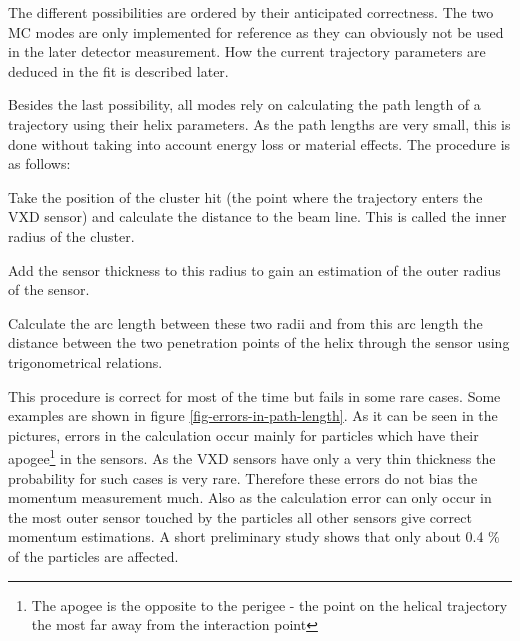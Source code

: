 The different possibilities are ordered by their anticipated correctness. The two MC modes are only implemented for reference as they can obviously not be used in the later detector measurement. How the current trajectory parameters are deduced in the fit is described later.

Besides the last possibility, all modes rely on calculating the path length of a trajectory using their helix parameters. As the path lengths are very small, this is done without taking into account energy loss or material effects. The procedure is as follows:
\begin{zlist}
 \item Take the position of the cluster hit (the point where the trajectory enters the VXD sensor) and calculate the distance to the beam line. This is called the inner radius of the cluster.
 \item Add the sensor thickness to this radius to gain an estimation of the outer radius of the sensor.
 \item Calculate the arc length between these two radii and from this arc length the distance between the two penetration points of the helix through the sensor using trigonometrical relations.
\end{zlist}

This procedure is correct for most of the time but fails in some rare cases. Some examples are shown in figure \ref{fig-errors-in-path-length}. As it can be seen in the pictures, errors in the calculation occur mainly for particles which have their apogee\footnote{The apogee is the opposite to the perigee - the point on the helical trajectory the most far away from the interaction point} in the sensors. As the VXD sensors have only a very thin thickness the probability for such cases is very rare. Therefore these errors do not bias the momentum measurement much. Also as the calculation error can only occur in the most outer sensor touched by the particles all other sensors give correct momentum estimations. A short preliminary study shows that only about 0.4 \% of the particles are affected.

